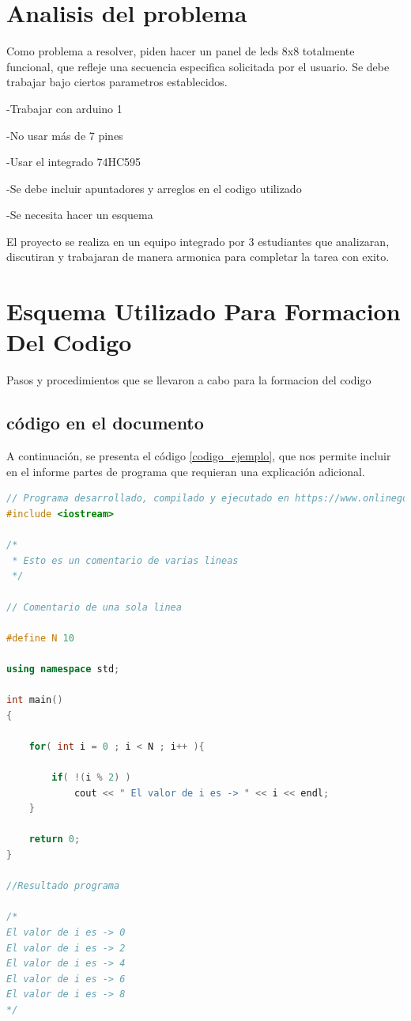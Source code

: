 \documentclass{article}
\begin{document}
\section{Analisis del problema} \label{contenido}
Como problema a resolver, piden hacer un panel de leds 8x8 totalmente funcional, que refleje una secuencia especifica solicitada por el usuario.
Se debe trabajar bajo ciertos parametros establecidos.

-Trabajar con arduino 1

-No usar más de 7 pines

-Usar el integrado 74HC595

-Se debe incluir apuntadores y arreglos en el codigo utilizado

-Se necesita hacer un esquema

El proyecto se realiza en un equipo integrado por 3 estudiantes que analizaran, discutiran y trabajaran de manera armonica para completar la tarea con exito.
\section{Esquema Utilizado Para Formacion Del Codigo}
Pasos y procedimientos que se llevaron a cabo para la formacion del codigo



\subsection{código en el documento}
%
A continuación, se presenta el código \ref{codigo_ejemplo}, que nos permite incluir en el informe partes de programa que requieran una explicación adicional.
\begin{lstlisting}[language=C++, label=codigo_ejemplo]
// Programa desarrollado, compilado y ejecutado en https://www.onlinegdb.com
#include <iostream>

/*
 * Esto es un comentario de varias lineas
 */

// Comentario de una sola linea

#define N 10

using namespace std;

int main()
{
    
    for( int i = 0 ; i < N ; i++ ){
        
        if( !(i % 2) )
            cout << " El valor de i es -> " << i << endl;
    }
    
    return 0;
}

//Resultado programa

/*
El valor de i es -> 0
El valor de i es -> 2
El valor de i es -> 4
El valor de i es -> 6
El valor de i es -> 8
*/
\end{lstlisting}
\end{document}
